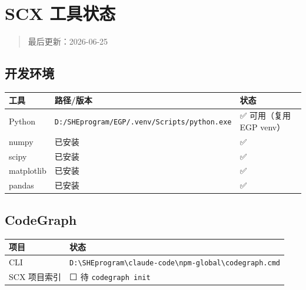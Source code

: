 \documentclass[
  12pt,
]{ctexart}
\author{SCX}
\date{2026}
\begin{document}
\section{SCX 工具状态}\label{scx-ux5de5ux5177ux72b6ux6001}

\begin{quote}
最后更新：2026-06-25
\end{quote}

\subsection{开发环境}\label{ux5f00ux53d1ux73afux5883}

\begin{longtable}[]{@{}
  >{\raggedright\arraybackslash}p{}
  >{\raggedright\arraybackslash}p{}
  >{\raggedright\arraybackslash}p{}@{}}
\toprule\noalign{}
\begin{minipage}[b]{\linewidth}\raggedright
工具
\end{minipage} & \begin{minipage}[b]{\linewidth}\raggedright
路径/版本
\end{minipage} & \begin{minipage}[b]{\linewidth}\raggedright
状态
\end{minipage} \\
\midrule\noalign{}
\endhead
\bottomrule\noalign{}
\endlastfoot
Python & \texttt{D:/SHEprogram/EGP/.venv/Scripts/python.exe} & ✅
可用（复用 EGP venv） \\
numpy & 已安装 & ✅ \\
scipy & 已安装 & ✅ \\
matplotlib & 已安装 & ✅ \\
pandas & 已安装 & ✅ \\
\end{longtable}

\subsection{CodeGraph}\label{codegraph}

\begin{longtable}[]{@{}ll@{}}
\toprule\noalign{}
项目 & 状态 \\
\midrule\noalign{}
\endhead
\bottomrule\noalign{}
\endlastfoot
CLI &
\texttt{D:\textbackslash{}SHEprogram\textbackslash{}claude-code\textbackslash{}npm-global\textbackslash{}codegraph.cmd} \\
SCX 项目索引 & ⬜ 待 \texttt{codegraph\ init} \\
\end{longtable}
\end{document}
